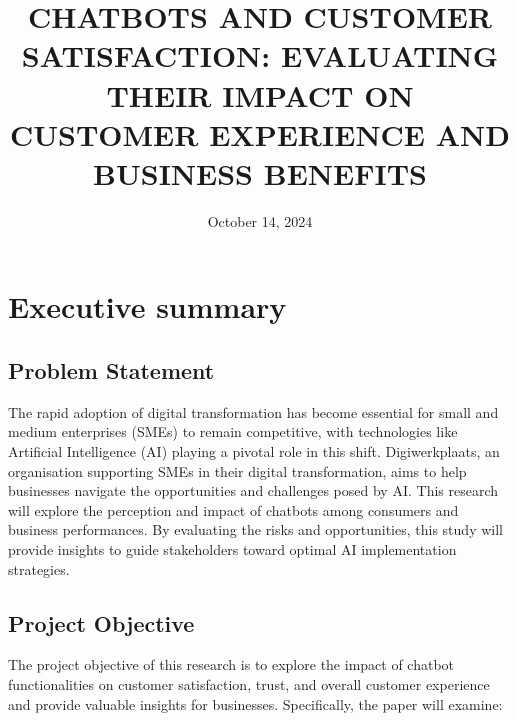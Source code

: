 \documentclass[a4paper]{article}
\title{CHATBOTS AND CUSTOMER SATISFACTION: EVALUATING THEIR
IMPACT ON CUSTOMER EXPERIENCE AND BUSINESS BENEFITS}
\author{\makebox[\textwidth]{Ibrahim Abdo (231018), Jason van Hamond (232567), Radna Puriel (234908), Maria Salop (230574)}}
\date{October 14, 2024}
\begin{document}
\maketitle
\section{Executive summary}

\subsection{Problem Statement}
The rapid adoption of digital transformation has become essential for small and medium enterprises (SMEs) to remain competitive, with technologies like Artificial Intelligence (AI) playing a pivotal role in this shift. Digiwerkplaats, an organisation supporting SMEs in their digital transformation, aims to help businesses navigate the opportunities and challenges posed by AI. This research will explore the perception and impact of chatbots among consumers and business performances. By evaluating the risks and opportunities, this study will provide insights to guide stakeholders toward optimal AI implementation strategies.

\subsection{Project Objective}
The project objective of this research is to explore the impact of chatbot functionalities on customer satisfaction, trust, and overall customer experience and provide valuable insights for businesses. Specifically, the paper will examine: 
\end{document}
